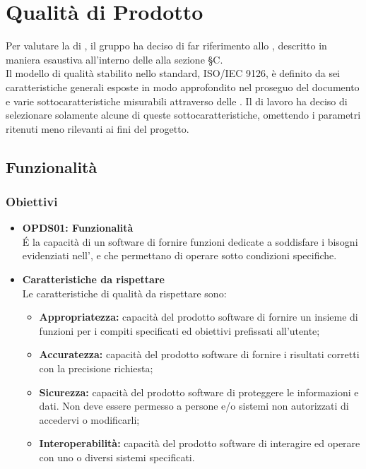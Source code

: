 \section{Qualità di Prodotto}
\label{qualità_prodotto}
Per valutare la  di , il gruppo {\Gruppo} ha deciso di far riferimento allo  , descritto in maniera esaustiva all'interno delle \textit{} alla sezione \S{C}. \\
Il modello di qualità stabilito nello standard, ISO/IEC 9126, è definito da sei caratteristiche generali esposte in modo approfondito nel proseguo del documento e varie sottocaratteristiche misurabili attraverso delle . Il  di lavoro ha deciso di selezionare solamente alcune di queste sottocaratteristiche, omettendo i parametri ritenuti meno rilevanti ai fini del progetto.

\subsection{Funzionalità}
\subsubsection{Obiettivi}
\begin{itemize}
	\item \textbf{OPDS01: Funzionalità} \\
	É la capacità di un software di fornire funzioni dedicate a soddisfare i bisogni evidenziati nell'\textit{\AdR}, e che permettano di operare sotto  condizioni specifiche.
	\item \textbf{Caratteristiche da rispettare} \\
	Le caratteristiche di qualità da rispettare sono:
	\begin{itemize}
		\item \textbf{Appropriatezza:} capacità del prodotto software di fornire un insieme di funzioni per i compiti specificati ed obiettivi prefissati all'utente;
		\item \textbf{Accuratezza:} capacità del prodotto software di fornire i risultati corretti con la precisione richiesta;
		\item \textbf{Sicurezza:} capacità del prodotto software di proteggere le informazioni e dati. Non deve essere permesso a persone e/o sistemi non autorizzati di accedervi o modificarli;
		\item \textbf{Interoperabilità:} capacità del prodotto software di interagire ed operare con uno o diversi sistemi specificati.
	\end{itemize}
\end{itemize}

